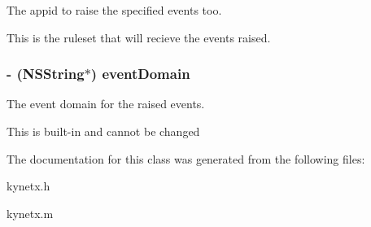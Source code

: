 The appid to raise the specified events too. 

This is the ruleset that will recieve the events raised. \hypertarget{interface_kynetx_a1d11d684d766bb4a70cc4df94519f82f}{
\subsubsection[{eventDomain}]{\setlength{\rightskip}{0pt plus 5cm}-\/ (NSString$\ast$) eventDomain}}
\label{interface_kynetx_a1d11d684d766bb4a70cc4df94519f82f}


The event domain for the raised events. 

This is built-\/in and cannot be changed 

The documentation for this class was generated from the following files:\begin{DoxyCompactItemize}
\item 
kynetx.h\item 
kynetx.m\end{DoxyCompactItemize}
